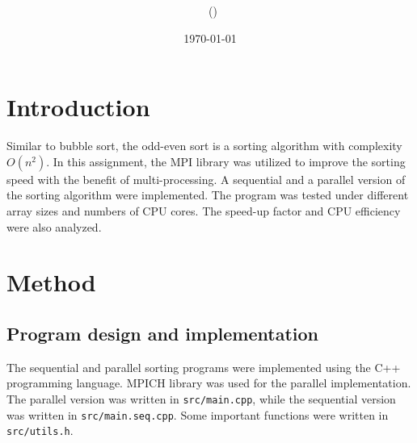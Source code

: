 \documentclass[twoside,12pt]{article}
\title{{\lms \Code \ \Ass}}
\author{\lms \name \ (\href{mailto:\mail}{\mail})}
\date{\sffamily \today}
\makeatletter
\theoremstyle{definition}
\theoremstyle{remark}
\renewcommand{\maketitle}{\bgroup\setlength{\parindent}{0pt}
\begin{flushleft}
  \textbf{\Large\@title}

  \@author
\end{flushleft}\egroup
}
\makeatother
\begin{document}
\maketitle
\thispagestyle{title}

\section{Introduction}
Similar to bubble sort, the odd-even sort is a sorting algorithm with complexity $O(n^2)$.
In this assignment, the MPI library was utilized to improve the
sorting speed with the benefit of multi-processing.
A sequential and a parallel version of the sorting algorithm were implemented.
The program was tested under different array sizes and numbers of CPU cores.
The speed-up factor and CPU efficiency were also analyzed.



\section{Method}
\subsection{Program design and implementation}
The sequential and parallel sorting programs were implemented using the C++ programming language.
MPICH library was used for the parallel implementation.
The parallel version was written in \lstinline|src/main.cpp|, 
while the sequential version was written in \lstinline|src/main.seq.cpp|.
Some important functions were written in \lstinline|src/utils.h|.
\end{document}
